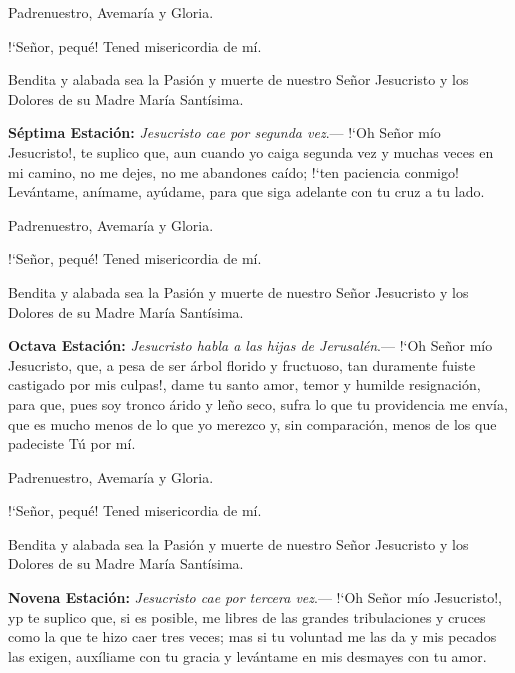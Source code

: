 Padrenuestro, Avemaría y Gloria.

{!`}Señor, pequé! Tened misericordia de mí.

Bendita y alabada sea la Pasión y muerte de nuestro Señor Jesucristo y los Dolores de su Madre María Santísima.

\vspace{2mm}

\textbf{Séptima Estación:} \textit{Jesucristo cae por segunda vez}.--- {!`}Oh Señor mío Jesucristo!, te suplico que, aun cuando yo caiga segunda vez y muchas veces en mi camino, no me dejes,
no me abandones caído; {!`}ten paciencia conmigo! Levántame, anímame, ayúdame, para que siga adelante con tu cruz a tu lado.

\vspace{2mm}

Padrenuestro, Avemaría y Gloria.

{!`}Señor, pequé! Tened misericordia de mí.

Bendita y alabada sea la Pasión y muerte de nuestro Señor Jesucristo y los Dolores de su Madre María Santísima.

\vspace{2mm}

\textbf{Octava Estación:} \textit{Jesucristo habla a las hijas de Jerusalén}.--- {!`}Oh Señor mío Jesucristo, que, a pesa de ser árbol florido y fructuoso, tan duramente fuiste castigado
por mis culpas!, dame tu santo amor, temor y humilde resignación, para que, pues soy tronco árido y leño seco, sufra lo que tu providencia me envía, que es mucho menos de lo que yo 
merezco y, sin comparación, menos de los que padeciste Tú por mí. 

\vspace{2mm}

Padrenuestro, Avemaría y Gloria.

{!`}Señor, pequé! Tened misericordia de mí.

Bendita y alabada sea la Pasión y muerte de nuestro Señor Jesucristo y los Dolores de su Madre María Santísima.

\vspace{2mm}

\textbf{Novena Estación:} \textit{Jesucristo cae por tercera vez}.--- {!`}Oh Señor mío Jesucristo!, yp te suplico que, si es posible, me libres de las grandes tribulaciones y cruces como la
que te hizo caer tres veces; mas si tu voluntad me las da y mis pecados las exigen, auxíliame con tu gracia y levántame en mis desmayes con tu amor.

